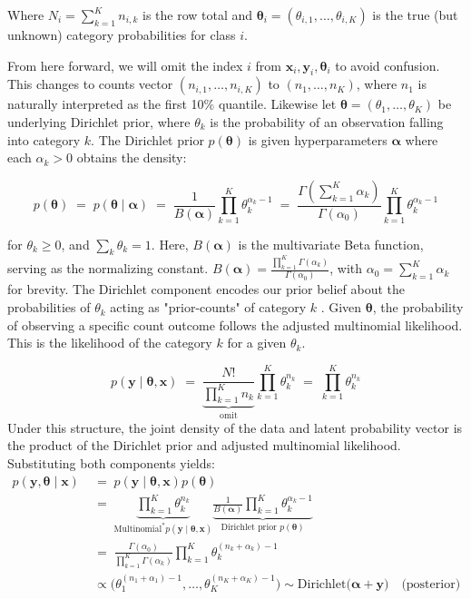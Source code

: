 Where \(N_i = \sum_{k=1}^{K}n_{i,k}\) is the row total and \(\boldsymbol{\theta}_i = (\theta_{i,1},\dots,\theta_{i,K})\) is the true (but unknown) category probabilities for class \(i\). 

From here forward, we will omit the index \(i\) from \(\mathbf{x}_i, \mathbf{y}_i,\boldsymbol{\theta}_i\) to avoid confusion. This changes to counts vector \((n_{i,1}, \dots, n_{i,K})\) to \((n_{1}, \dots, n_{K})\), where \(n_1\) is naturally interpreted as the first 10\% quantile. Likewise let \(\boldsymbol{\theta} = (\theta_1, \dots, \theta_K)\) be underlying Dirichlet prior, where \(\theta_k\) is the probability of an observation falling into category \(k\). The Dirichlet prior \(p(\boldsymbol{\theta})\) is given hyperparameters \(\boldsymbol{\alpha}\) where each \(\alpha_k > 0\) obtains the density:

\[
    p(\boldsymbol{\theta})
    \;=\;
   p(\boldsymbol{\theta} \mid \boldsymbol{\alpha})
    \;=\;
        \frac{1}{B(\boldsymbol{\alpha})} 
    \prod_{k=1}^K \theta_k^{\alpha_k -1}
    \;=\;
    \frac{\Gamma(\sum_{k=1}^K \alpha_k)}{\Gamma(\alpha_0)} 
    \prod_{k=1}^K \theta_k^{\alpha_k -1}
\]

for \(\theta_k \ge 0\), and \(\sum_k \theta_k = 1\). Here, \(B(\boldsymbol{\alpha})\) is the multivariate Beta function, serving as the normalizing constant. \(B(\boldsymbol{\alpha}) = \frac{\prod_{k=1}^K \Gamma(\alpha_k)}{\Gamma(\alpha_0)}\), with \(\alpha_0 = \sum_{k=1}^K \alpha_k\) for brevity. The Dirichlet component encodes our prior belief about the probabilities of \(\theta_k\) acting as "prior-counts" of category \(k\) \citep{wiki:dirichlet-multinomial}. Given \(\boldsymbol{\theta}\), the probability of observing a specific count outcome follows the adjusted multinomial likelihood. This is the likelihood of the category \(k\) for a given \(\theta_k\).

\[
    p(\mathbf{y} \mid \boldsymbol{\theta}, \mathbf{x}) 
    \;=\;
   \underbrace{\frac{N!}{\prod_{k=1}^K n_k}}_{\text{omit}} \prod_{k=1}^K \theta_k^{n_k} 
    \;=\; 
    \prod_{k=1}^K \theta_k^{n_k} 
\]
Under this structure, the joint density of the data and latent probability vector is the product of the Dirichlet prior and adjusted multinomial likelihood. Substituting both components yields:
\begin{align*}
    p(\mathbf{y}, \boldsymbol{\theta} \mid \mathbf{x}) 
    \;&=\; 
    p(\mathbf{y} \mid \boldsymbol{\theta}, \mathbf{x}) p(\boldsymbol{\theta}) \\
    \;&=\;
    \underbrace{
    \prod_{k=1}^K \theta_k^{n_k}}_{\text{Multinomial}^\ast p(\mathbf{y} \mid \boldsymbol{\theta}, \mathbf{x})} 
    \underbrace{
    \frac{1}{B(\boldsymbol{\alpha})} 
    \prod_{k=1}^K \theta_k^{\alpha_k -1}
    }_{\text{Dirichlet prior } p(\boldsymbol{\theta})}\\
    \;&=\;
    \frac{\Gamma(\alpha_0)}{\prod_{k=1}^K \Gamma(\alpha_k)} 
    \prod_{k=1}^K \theta_k^{(n_k + \alpha_k) - 1}\\
    &\varpropto \bigl( \theta_1^{(n_1+\alpha_1)-1},\ldots, \theta_K^{(n_K+\alpha_K)-1} \bigr) \sim \mathrm{Dirichlet} \bigl(\boldsymbol{\alpha}+\mathbf{y}\bigr) \quad \text{(posterior)}
\end{align*}

